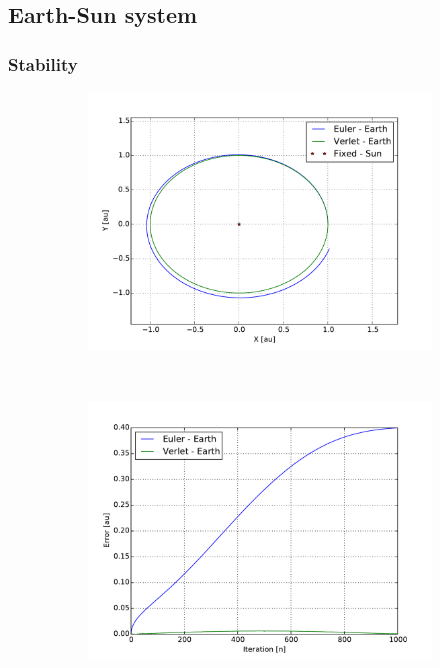 \subsection{Earth-Sun system}

\subsubsection{Stability}

\begin{figure}[H]
    \centering
    \begin{subfigure}{0.5\textwidth}
        \centering
        \includegraphics[width=\linewidth]{result/bilder/earth-sun.pdf}
    	\caption{}
    \end{subfigure}%
    ~ 
    \begin{subfigure}{0.5\textwidth}
        \centering
        \includegraphics[width=\linewidth]{result/bilder/earth-sun-error.pdf}

\end{subfigure}
\end{figure}
